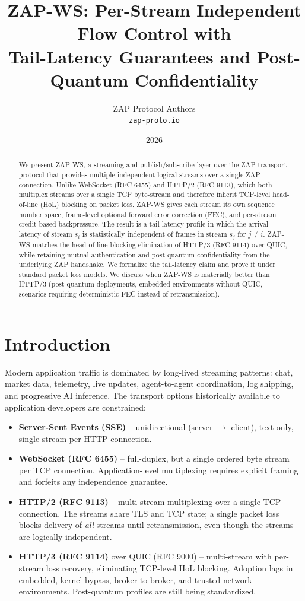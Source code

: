 \documentclass[11pt,a4paper]{article}
\title{ZAP-WS: Per-Stream Independent Flow Control with\\
Tail-Latency Guarantees and Post-Quantum Confidentiality}
\author{ZAP Protocol Authors\\
\texttt{zap-proto.io}}
\date{2026}
\begin{document}
\maketitle

\begin{abstract}
We present ZAP-WS, a streaming and publish/subscribe layer over the ZAP transport
protocol that provides multiple independent logical streams over a single ZAP
connection. Unlike WebSocket (RFC 6455) and HTTP/2 (RFC 9113), which both
multiplex streams over a single TCP byte-stream and therefore inherit
TCP-level head-of-line (HoL) blocking on packet loss, ZAP-WS gives each
stream its own sequence number space, frame-level optional forward error
correction (FEC), and per-stream credit-based backpressure. The result is a
tail-latency profile in which the arrival latency of stream $s_i$ is
statistically independent of frames in stream $s_j$ for $j \ne i$. ZAP-WS
matches the head-of-line blocking elimination of HTTP/3 (RFC 9114) over
QUIC, while retaining mutual authentication and post-quantum
confidentiality from the underlying ZAP handshake. We formalize the
tail-latency claim and prove it under standard packet loss models. We
discuss when ZAP-WS is materially better than HTTP/3 (post-quantum
deployments, embedded environments without QUIC, scenarios requiring
deterministic FEC instead of retransmission).
\end{abstract}

\section{Introduction}

Modern application traffic is dominated by long-lived streaming patterns:
chat, market data, telemetry, live updates, agent-to-agent coordination,
log shipping, and progressive AI inference. The transport options
historically available to application developers are constrained:

\begin{itemize}
\item \textbf{Server-Sent Events (SSE)} -- unidirectional (server $\to$
client), text-only, single stream per HTTP connection.
\item \textbf{WebSocket (RFC 6455)} \cite{rfc6455} -- full-duplex, but a
single ordered byte stream per TCP connection. Application-level
multiplexing requires explicit framing and forfeits any independence
guarantee.
\item \textbf{HTTP/2 (RFC 9113)} \cite{rfc9113} -- multi-stream
multiplexing over a single TCP connection. The streams share TLS and TCP
state; a single packet loss blocks delivery of \emph{all} streams until
retransmission, even though the streams are logically independent.
\item \textbf{HTTP/3 (RFC 9114)} \cite{rfc9114} over QUIC (RFC 9000)
\cite{rfc9000} -- multi-stream with per-stream loss recovery, eliminating
TCP-level HoL blocking. Adoption lags in embedded, kernel-bypass,
broker-to-broker, and trusted-network environments. Post-quantum profiles
are still being standardized.
\end{itemize}
\end{document}
